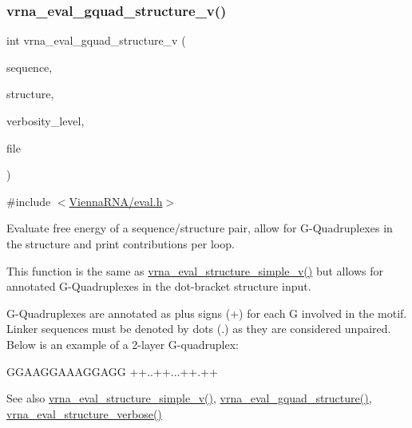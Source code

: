 \subsubsection{\texorpdfstring{vrna\+\_\+eval\+\_\+gquad\+\_\+structure\+\_\+v()}{vrna\_eval\_gquad\_structure\_v()}}
{\footnotesize\ttfamily int vrna\+\_\+eval\+\_\+gquad\+\_\+structure\+\_\+v (\begin{DoxyParamCaption}\item[{const char $\ast$}]{sequence,  }\item[{const char $\ast$}]{structure,  }\item[{int}]{verbosity\+\_\+level,  }\item[{F\+I\+LE $\ast$}]{file }\end{DoxyParamCaption})}



{\ttfamily \#include $<$\mbox{\hyperlink{eval_8h}{Vienna\+R\+N\+A/eval.\+h}}$>$}



Evaluate free energy of a sequence/structure pair, allow for G-\/\+Quadruplexes in the structure and print contributions per loop. 

This function is the same as \mbox{\hyperlink{group__eval_gacd6278343e77d13f1d53588e50d303bc}{vrna\+\_\+eval\+\_\+structure\+\_\+simple\+\_\+v()}} but allows for annotated G-\/\+Quadruplexes in the dot-\/bracket structure input.

G-\/\+Quadruplexes are annotated as plus signs (\textquotesingle{}+\textquotesingle{}) for each G involved in the motif. Linker sequences must be denoted by dots (\textquotesingle{}.\textquotesingle{}) as they are considered unpaired. Below is an example of a 2-\/layer G-\/quadruplex\+: 
\begin{DoxyCode}
GGAAGGAAAGGAGG
++..++...++.++
\end{DoxyCode}


\begin{DoxySeeAlso}{See also}
\mbox{\hyperlink{group__eval_gacd6278343e77d13f1d53588e50d303bc}{vrna\+\_\+eval\+\_\+structure\+\_\+simple\+\_\+v()}}, \mbox{\hyperlink{group__eval_ga3263504825ef4b523eba797c99921df4}{vrna\+\_\+eval\+\_\+gquad\+\_\+structure()}}, \mbox{\hyperlink{group__eval_ga0928d699d310178f84ee2351034e5cb5}{vrna\+\_\+eval\+\_\+structure\+\_\+verbose()}}
\end{DoxySeeAlso}

